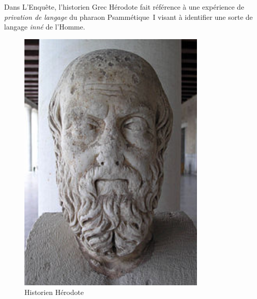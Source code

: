 \begin{minipage}{0.5\linewidth}
Dans \og L'Enquête\fg{}, l'historien Grec Hérodote fait référence à une expérience de \emph{privation de langage} du pharaon Psammétique~I visant à identifier une sorte de langage \emph{inné} de l'Homme\cite{herodote-privation}. 
\vspace{1cm}
\end{minipage}
\begin{minipage}[H]{0.49\linewidth}
  \begin{figure}[H]
  \centering
  \includegraphics[width=0.8\textwidth]{../resources/illustrations/herodote}
  \caption{Historien Hérodote}
  \end{figure}
\end{minipage}

